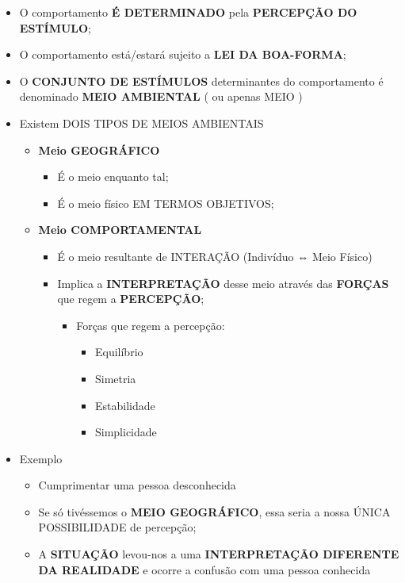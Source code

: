 \documentclass[
]{book}
\providecommand{\tightlist}{%
  \setlength{\itemsep}{0pt}\setlength{\parskip}{0pt}}
\begin{document}
\begin{itemize}
\tightlist
\item
  O comportamento \textbf{É DETERMINADO} pela \textbf{PERCEPÇÃO DO ESTÍMULO};
\item
  O comportamento está/estará sujeito a \textbf{LEI DA BOA-FORMA};
\item
  O \textbf{CONJUNTO DE ESTÍMULOS} determinantes do comportamento é denominado \textbf{MEIO AMBIENTAL} ( ou apenas MEIO )
\item
  Existem DOIS TIPOS DE MEIOS AMBIENTAIS

  \begin{itemize}
  \tightlist
  \item
    \textbf{Meio GEOGRÁFICO}

    \begin{itemize}
    \tightlist
    \item
      É o meio enquanto tal;
    \item
      É o meio físico EM TERMOS OBJETIVOS;
    \end{itemize}
  \item
    \textbf{Meio COMPORTAMENTAL}

    \begin{itemize}
    \tightlist
    \item
      É o meio resultante de INTERAÇÃO (Indivíduo ⇔ Meio Físico)
    \item
      Implica a \textbf{INTERPRETAÇÃO} desse meio através das \textbf{FORÇAS} que regem a \textbf{PERCEPÇÃO};

      \begin{itemize}
      \tightlist
      \item
        Forças que regem a percepção:

        \begin{itemize}
        \tightlist
        \item
          Equilíbrio
        \item
          Simetria
        \item
          Estabilidade
        \item
          Simplicidade
        \end{itemize}
      \end{itemize}
    \end{itemize}
  \end{itemize}
\item
  Exemplo

  \begin{itemize}
  \tightlist
  \item
    Cumprimentar uma pessoa desconhecida
  \item
    Se só tivéssemos o \textbf{MEIO GEOGRÁFICO}, essa seria a nossa ÚNICA POSSIBILIDADE de percepção;
  \item
    A \textbf{SITUAÇÃO} levou-nos a uma \textbf{INTERPRETAÇÃO DIFERENTE DA REALIDADE} e ocorre a confusão com uma pessoa conhecida


\end{itemize}
\end{itemize}
\end{document}

